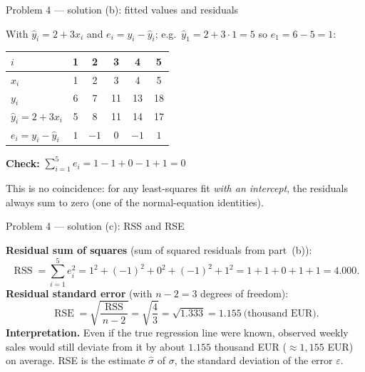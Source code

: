 \documentclass[aspectratio=169,11pt]{beamer}
\begin{document}
\begin{frame}{Problem 4 --- solution (b): fitted values and residuals}
  \begin{solutionbox}
    With $\hat y_i=2+3x_i$ and $e_i=y_i-\hat y_i$; e.g.\ $\hat y_1=2+3\cdot 1=5$ so $e_1=6-5=1$:
    \begin{center}\footnotesize
    \begin{tabular}{lccccc}
      \toprule
      $i$ & 1 & 2 & 3 & 4 & 5\\
      \midrule
      $x_i$ & 1 & 2 & 3 & 4 & 5\\
      $y_i$ & 6 & 7 & 11 & 13 & 18\\
      $\hat y_i=2+3x_i$ & 5 & 8 & 11 & 14 & 17\\
      $e_i=y_i-\hat y_i$ & $1$ & $-1$ & $0$ & $-1$ & $1$\\
      \bottomrule
    \end{tabular}
    \end{center}
    \textbf{Check:} $\sum_{i=1}^{5} e_i = 1-1+0-1+1 = 0$ \checkmark
    \smallskip

    This is no coincidence: for any least-squares fit \emph{with an intercept}, the residuals
    always sum to zero (one of the normal-equation identities).
  \end{solutionbox}
\end{frame}

\begin{frame}{Problem 4 --- solution (c): RSS and RSE}
  \begin{solutionbox}
    \textbf{Residual sum of squares} (sum of squared residuals from part~(b)):
    \[
      \operatorname{RSS}=\sum_{i=1}^{5} e_i^2 = 1^2+(-1)^2+0^2+(-1)^2+1^2 = 1+1+0+1+1 = 4.000.
    \]
    \textbf{Residual standard error} (with $n-2=3$ degrees of freedom):
    \[
      \operatorname{RSE}=\sqrt{\frac{\operatorname{RSS}}{\,n-2\,}}=\sqrt{\frac{4}{3}}
      =\sqrt{1.333}=1.155 \ \text{(thousand EUR)}.
    \]
    \textbf{Interpretation.} Even if the true regression line were known, observed weekly sales
    would still deviate from it by about $1.155$ thousand EUR ($\approx 1{,}155$ EUR) on average.
    RSE is the estimate $\hat\sigma$ of $\sigma$, the standard deviation of the error $\varepsilon$.
  \end{solutionbox}
\end{frame}
\end{document}
